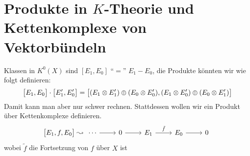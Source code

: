 \section*{Produkte in $K$-Theorie und Kettenkomplexe von Vektorbündeln}
Klassen in $K^0(X)$ sind $[E_1,E_0]$ \enquote{$=$} $E_1 -E_0$, die Produkte könnten wir wie folgt definieren: 
\[
	\benbrace[\big]{E_1,E_0} \cdot \benbrace[\big]{E_1',E_0'} = \benbrace[\big]{(E_1\otimes E_1') \oplus (E_0 \otimes E_0'), (E_1 \otimes E_0')\oplus (E_0 \otimes E_1')} 
\]
Damit kann man aber nur schwer rechnen. Stattdessen wollen wir ein Produkt über Kettenkomplexe definieren.
\[
	\benbrace[\big]{E_1,f,E_0}  \leadsto \begin{tikzcd}
		\cdots \rar & 0 \rar & E_1 \rar["\tilde{f}"] & E_0 \rar & 0 
	\end{tikzcd}
\]
wobei $\tilde{f}$ die Fortsetzung von $f$ über $X$ ist

